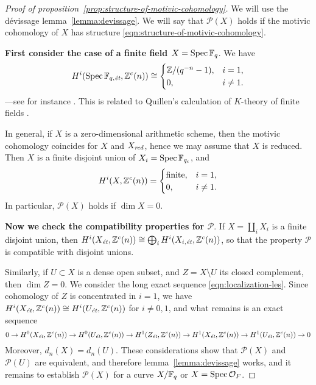 \documentclass{article}
\numberwithin{equation}{section}
\begin{document}
\begin{proof}[Proof of proposition~\ref{prop:structure-of-motivic-cohomology}]
  We will use the dévissage lemma~\ref{lemma:devissage}. We will say that
  $\mathcal{P} (X)$ holds if the motivic cohomology of $X$ has structure
  \eqref{eqn:structure-of-motivic-cohomology}.

  \vspace{1em}

  \textbf{First consider the case of a finite field $X = \Spec \FF_q$}.
  We have
  \begin{equation}
    \label{eqn:motivic-cohomology-finite-fields}
    H^i (\Spec \FF_{q,\et}, \ZZ^c (n)) \cong
    \begin{cases}
      \ZZ/(q^{-n} - 1), & i = 1, \\
      0, & i \ne 1.
    \end{cases}
  \end{equation}
  ---see for instance \cite[Example~4.2]{Geisser-2017}. This is related to
  Quillen's calculation of $K$-theory of finite fields \cite{Quillen-1972}.

  In general, if $X$ is a zero-dimensional arithmetic scheme, then the motivic
  cohomology coincides for $X$ and $X_\red$, hence we may assume that $X$ is
  reduced. Then $X$ is a finite disjoint union of $X_i = \Spec \FF_{q_i}$, and
  \begin{equation}
    H^i (X, \ZZ^c (n)) = \begin{cases}
      \text{finite}, & i = 1, \\
      0, & i \ne 1.
    \end{cases}
  \end{equation}
  In particular, $\mathcal{P} (X)$ holds if $\dim X = 0$.

  \vspace{1em}

  \textbf{Now we check the compatibility properties for $\mathcal{P}$}.
  If $X = \coprod_i X_i$ is a finite disjoint union, then
  $H^i (X_\et, \ZZ^c (n)) \cong \bigoplus_i H^i (X_{i,\et}, \ZZ^c (n))$,
  so that the property $\mathcal{P}$ is compatible with disjoint unions.

  Similarly, if $U \subset X$ is a dense open subset, and $Z = X\setminus U$
  its closed complement, then $\dim Z = 0$. We consider the long exact sequence
  \eqref{eqn:localization-les}. Since cohomology of $Z$ is concentrated in
  $i = 1$, we have $H^i (X_\et, \ZZ^c (n)) \cong H^i (U_\et, \ZZ^c (n))$ for
  $i \ne 0,1$, and what remains is an exact sequence
  \[ 0 \to H^0 (X_\et, \ZZ^c (n)) \to
    H^0 (U_\et, \ZZ^c (n)) \to
    H^1 (Z_\et, \ZZ^c (n)) \to
    H^1 (X_\et, \ZZ^c (n)) \to
    H^1 (U_\et, \ZZ^c (n)) \to 0 \]
  Moreover, $d_n (X) = d_n (U)$. These considerations show that
  $\mathcal{P} (X)$ and $\mathcal{P} (U)$ are equivalent, and therefore
  lemma~\ref{lemma:devissage} works, and it remains to establish
  $\mathcal{P} (X)$ for a curve $X/\FF_q$ or $X = \Spec \mathcal{O}_F$.


\end{proof}
\end{document}
